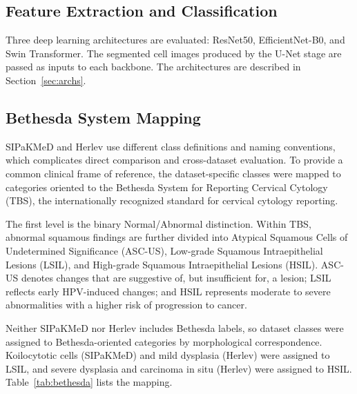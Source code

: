 \documentclass[runningheads]{llncs}
\begin{document}
\subsection{Feature Extraction and Classification}

Three deep learning architectures are evaluated: ResNet50, EfficientNet-B0, and Swin Transformer. The segmented cell images produced by the U-Net stage are passed as inputs to each backbone. The architectures are described in Section~\ref{sec:archs}.

\subsection{Bethesda System Mapping}
\label{sec:bethesda}

SIPaKMeD and Herlev use different class definitions and naming conventions, which complicates direct comparison and cross-dataset evaluation. To provide a common clinical frame of reference, the dataset-specific classes were mapped to categories oriented to the Bethesda System for Reporting Cervical Cytology (TBS), the internationally recognized standard for cervical cytology reporting.

The first level is the binary Normal/Abnormal distinction. Within TBS, abnormal squamous findings are further divided into Atypical Squamous Cells of Undetermined Significance (ASC-US), Low-grade Squamous Intraepithelial Lesions (LSIL), and High-grade Squamous Intraepithelial Lesions (HSIL). ASC-US denotes changes that are suggestive of, but insufficient for, a lesion; LSIL reflects early HPV-induced changes; and HSIL represents moderate to severe abnormalities with a higher risk of progression to cancer.

Neither SIPaKMeD nor Herlev includes Bethesda labels, so dataset classes were assigned to Bethesda-oriented categories by morphological correspondence. Koilocytotic cells (SIPaKMeD) and mild dysplasia (Herlev) were assigned to LSIL, and severe dysplasia and carcinoma in situ (Herlev) were assigned to HSIL. Table~\ref{tab:bethesda} lists the mapping.
\end{document}
